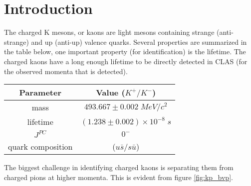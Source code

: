 \section{Introduction}

The charged K mesons, or kaons are light mesons containing strange (anti-strange) and up (anti-up) valence quarks.  Several properties are summarized in the table below, one important property (for identification) is the lifetime.  The charged kaons have a long enough lifetime to be directly detected in CLAS (for the observed momenta that is detected).

\begin{center}
  \begin{tabular}{| c | c |}
    \hline
    Parameter & Value ($K^{+}/K^{-}$) \\ \hline \hline
    mass & $493.667 \pm 0.002 \; MeV/c^{2}$ \\ \hline
    lifetime & $(1.238 \pm 0.002) \times 10^{-8} \; s$ \\ \hline
    $J^{PC}$ & $0^{-}$ \\ \hline
    quark composition & ($u\bar{s} / s\bar{u}$) \\ \hline
  \end{tabular}
\end{center}

The biggest challenge in identifying charged kaons is separating them from charged pions at higher momenta.  This is evident from figure \ref{fig:kp_bvp}. 
